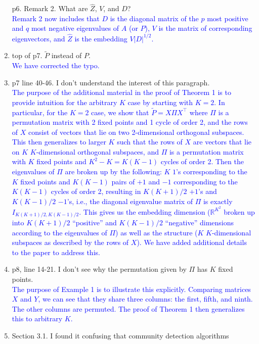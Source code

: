 \documentclass[
]{article}
\begin{document}
\begin{enumerate}
  p6. Remark 2. What are \(\hat{Z}\), \(V\), and \(D\)?\\
  \textcolor{blue}{
  Remark 2 now includes that $D$ is the diagonal matrix of the $p$ most positive and $q$ most negative eigenvalues of $A$ (or $P$), $V$ is the matrix of corresponding eigenvectors, and $\hat{Z}$ is the embedding $V |D|^{1/2}$.
  }
\item
  top of p7. \(\tilde{P}\) instead of \({P}\).\\
  \textcolor{blue}{
  We have corrected the typo. 
  }
\item
  p7 line 40-46. I don't understand the interest of this paragraph.\\
  \textcolor{blue}{
  The purpose of the additional material in the proof of Theorem 1 is to provide intuition for the arbitrary $K$ case by starting with $K = 2$. 
  In particular, for the $K = 2$ case, we show that $\tilde{P} = X \Pi X^\top$ where $\Pi$ is a permutation matrix with 2 fixed points and 1 cycle of order 2, and the rows of $X$ consist of vectors that lie on two 2-dimensional orthogonal subspaces. 
  This then generalizes to larger $K$ such that the rows of $X$ are vectors that lie on $K$ $K$-dimensional orthogonal subspaces, and $\Pi$ is a permutation matrix with $K$ fixed points and $K^2 - K = K (K - 1)$ cycles of order 2. 
  Then the eigenvalues of $\Pi$ are broken up by the following: $K$ $1$'s corresponding to the $K$ fixed points and $K (K - 1)$ pairs of $+1$ and $-1$ corresponding to the $K (K - 1)$ cycles of order 2, 
  resulting in $K (K + 1) / 2$ $+1$'s and $K (K - 1) / 2$ $-1$'s, i.e., the diagonal eigenvalue matrix of $\Pi$ is exactly $I_{K (K + 1) / 2, K (K - 1) / 2}$. 
  This gives us the embedding dimension ($\mathbb{R}^{K^2}$ broken up into $K (K + 1) / 2$ ``positive'' and $K (K - 1) / 2$ ``negative'' dimensions according to the eigenvalues of $\Pi$) as well as the structure ($K$ $K$-dimensional subspaces as described by the rows of $X$). 
  We have added additional details to the paper to address this. 
  }
\item
  p8, line 14-21. I don't see why the permutation given by \(\Pi\) has
  \(K\) fixed points.\\
  \textcolor{blue}{
  The purpose of Example 1 is to illustrate this explicitly. 
  Comparing matrices $X$ and $Y$, we can see that they share three columns: the first, fifth, and ninth. 
  The other columns are permuted. 
  The proof of Theorem 1 then generalizes this to arbitrary $K$. 
  }
\item
  Section 3.1. I found it confusing that community detection algorithms

\end{enumerate}
\end{document}
